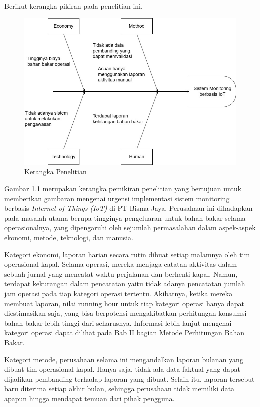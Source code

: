 \noindent Berikut kerangka pikiran pada penelitian ini.

\begin{figure}[ht]
    \includegraphics[width=1\linewidth, center]{images/pendahuluan/fig-framework-penelitian.jpg}
    \caption{Kerangka Penelitian}
    \label{fig:thinking-framework}
\end{figure}

\noindent Gambar 1.1  merupakan kerangka pemikiran penelitian yang bertujuan untuk memberikan gambaran mengenai urgensi implementasi sistem monitoring berbasis \textit{Internet of Things (IoT)} di PT Bisma Jaya. Perusahaan ini dihadapkan pada masalah utama berupa tingginya pengeluaran untuk bahan bakar selama operasionalnya, yang dipengaruhi oleh sejumlah permasalahan dalam aspek-aspek ekonomi, metode, teknologi, dan manusia.

Kategori ekonomi, laporan harian secara rutin dibuat setiap malamnya oleh tim operasional kapal. Selama operasi, mereka menjaga catatan aktivitas dalam sebuah jurnal yang mencatat waktu perjalanan dan berhenti kapal. Namun, terdapat kekurangan dalam pencatatan yaitu tidak adanya pencatatan jumlah jam operasi pada tiap kategori operasi tertentu. Akibatnya, ketika mereka membuat laporan, nilai running hour untuk tiap kategori operasi hanya dapat diestimasikan saja, yang bisa berpotensi mengakibatkan perhitungan konsumsi bahan bakar lebih tinggi dari seharusnya. Informasi lebih lanjut mengenai kategori operasi dapat dilihat pada Bab II bagian Metode Perhitungan Bahan Bakar.

Kategori metode, perusahaan selama ini mengandalkan laporan bulanan yang dibuat tim operasional kapal. Hanya saja, tidak ada data faktual yang dapat dijadikan pembanding terhadap laporan yang dibuat. Selain itu, laporan tersebut baru diterima setiap akhir bulan, sehingga perusahaan tidak memiliki data apapun hingga mendapat temuan dari pihak pengguna.

